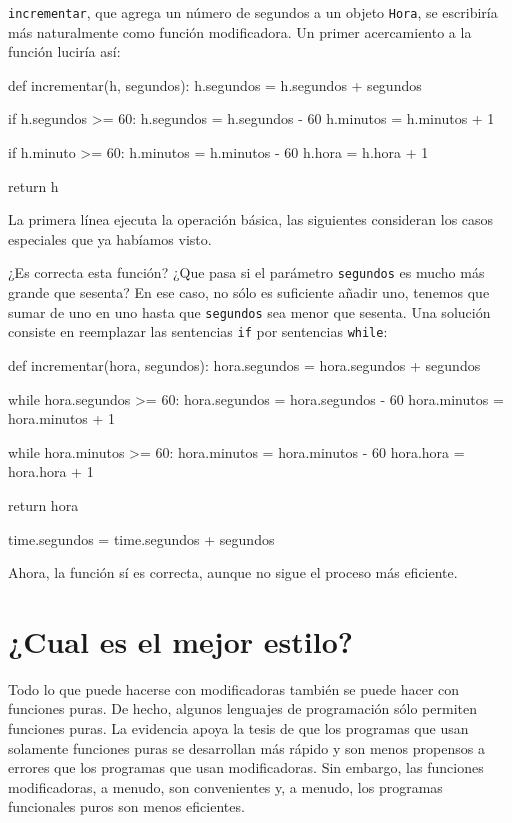 \texttt{incrementar}, que agrega un número de segundos a un objeto
\texttt{Hora}, se escribiría más naturalmente como función modificadora.
Un primer acercamiento a la función luciría así:

\pagebreak

\begin{pythoncode}
def incrementar(h, segundos):
  h.segundos = h.segundos + segundos

  if h.segundos >= 60:
    h.segundos = h.segundos - 60
    h.minutos = h.minutos + 1

  if h.minuto >= 60:
    h.minutos = h.minutos - 60
    h.hora = h.hora + 1

  return h
\end{pythoncode}

La primera línea ejecuta la operación básica, las siguientes consideran
los casos especiales que ya habíamos visto.

¿Es correcta esta función? ¿Que pasa si el parámetro \texttt{segundos}
es mucho más grande que sesenta? En ese caso, no sólo es suficiente
añadir uno, tenemos que sumar de uno en uno hasta que \texttt{segundos}
sea menor que sesenta. Una solución consiste en reemplazar las sentencias
\texttt{if} por sentencias \texttt{while}:
\begin{pythoncode}
def incrementar(hora, segundos):
  hora.segundos = hora.segundos + segundos

  while hora.segundos >= 60:
    hora.segundos = hora.segundos - 60
    hora.minutos = hora.minutos + 1

  while hora.minutos >= 60:
    hora.minutos = hora.minutos - 60
    hora.hora = hora.hora + 1

  return hora

  time.segundos = time.segundos + segundos
\end{pythoncode}

Ahora, la función sí es correcta, aunque no sigue el proceso más eficiente.

\section{¿Cual es el mejor estilo?}


Todo lo que puede hacerse con modificadoras también se puede hacer
con funciones puras. De hecho, algunos lenguajes de programación sólo
permiten funciones puras. La evidencia apoya la tesis de que los programas
que usan solamente funciones puras se desarrollan más rápido y son
menos propensos a errores que los programas que usan modificadoras.
Sin embargo, las funciones modificadoras, a menudo, son convenientes
y, a menudo, los programas funcionales puros son menos eficientes.

